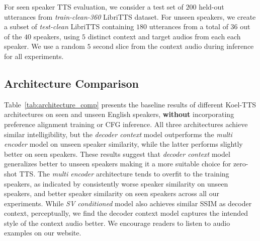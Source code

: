 For seen speaker TTS evaluation, we consider a test set of $200$ held-out utterances from \textit{train-clean-360} LibriTTS dataset. For unseen speakers, we create a subset of \textit{test-clean} LibriTTS containing $180$ utterances from a total of $36$ out of the $40$ speakers, using $5$ distinct context and target audios from each each speaker. We use a random $5$ second slice from the context audio during inference for all experiments.

\subsection{Architecture Comparison}
Table~\ref{tab:architecture_comp} presents the baseline results of different Koel-TTS architectures on seen and unseen English speakers, \textbf{without} incorporating preference alignment training or CFG inference.  
All three architectures achieve similar intelligibility, but the \textit{decoder context} model outperforms the \textit{multi encoder} model on unseen speaker similarity, while the latter performs slightly better on seen speakers.  
These results suggest that \emph{decoder context} model generalizes better to unseen speakers making it a more suitable choice for zero-shot TTS. 
The \textit{multi encoder} architecture tends to overfit to the training speakers, as indicated by consistently worse speaker similarity on unseen speakers, and better speaker similarity on seen speakers across all our experiments. 
While \textit{SV conditioned} model also achieves similar SSIM as decoder context, perceptually, we find the decoder context model captures the intended style of the context audio better. We encourage readers to listen to audio examples on our website.

